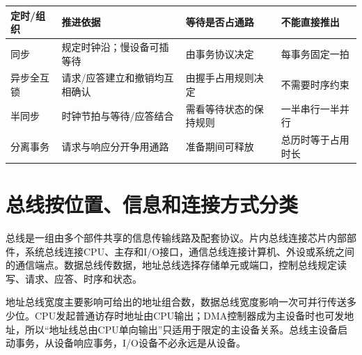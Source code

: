 \begin{wideblock}

\par\medskip\noindent\begin{minipage}{\linewidth}\fontsize{9.3}{12}\selectfont\begin{tabularx}{\linewidth}{@{}YYYY@{}}
\toprule\noalign{}
\begin{minipage}[b]{\linewidth}\raggedright
定时/组织
\end{minipage} & \begin{minipage}[b]{\linewidth}\raggedright
推进依据
\end{minipage} & \begin{minipage}[b]{\linewidth}\raggedright
等待是否占通路
\end{minipage} & \begin{minipage}[b]{\linewidth}\raggedright
不能直接推出
\end{minipage} \\
\midrule\noalign{}


同步 & 规定时钟沿；慢设备可插等待 & 由事务协议决定 & 每事务固定一拍 \\
异步全互锁 & 请求/应答建立和撤销均互相确认 & 由握手占用规则决定 & 不需要时序约束 \\
半同步 & 时钟节拍与等待/应答结合 & 需看等待状态的保持规则 & 一半串行一半并行 \\
分离事务 & 请求与响应分开争用通路 & 准备期间可释放 & 总历时等于占用时长 \\
\bottomrule\end{tabularx}
\end{minipage}\par\medskip

\end{wideblock}

\section{总线按位置、信息和连接方式分类}\label{CO06-types-complete}

总线是一组由多个部件共享的信息传输线路及配套协议。片内总线连接芯片内部部件，系统总线连接CPU、主存和I/O接口，通信总线连接计算机、外设或系统之间的通信端点。数据总线传数据，地址总线选择存储单元或端口，控制总线规定读写、请求、应答、时序和状态。

地址总线宽度主要影响可给出的地址组合数，数据总线宽度影响一次可并行传送多少位。CPU发起普通访存时地址由CPU输出；DMA控制器成为主设备时也可发地址，所以``地址线总由CPU单向输出''只适用于限定的主设备关系。总线主设备启动事务，从设备响应事务，I/O设备不必永远是从设备。

